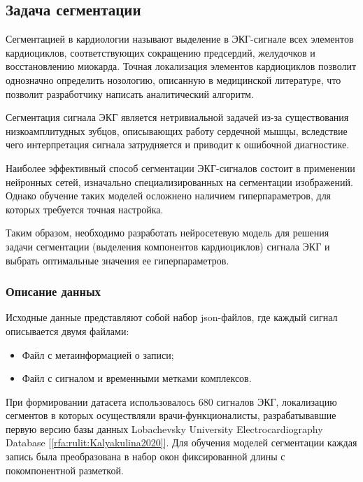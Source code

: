 \documentclass[10pt,a4paper]{book}
\begin{document}
\subsection{Задача сегментации}

Сегментацией в кардиологии называют выделение в ЭКГ-сигнале всех элементов кардиоциклов, соответствующих сокращению предсердий, желудочков и восстановлению миокарда. Точная локализация элементов кардиоциклов позволит однозначно определить нозологию, описанную в медицинской литературе, что позволит разработчику написать аналитический алгоритм.

Сегментация сигнала ЭКГ является нетривиальной задачей из-за существования низкоамплитудных зубцов, описывающих работу сердечной мышцы, вследствие чего интерпретация сигнала затрудняется и приводит к ошибочной диагностике.

Наиболее эффективный способ сегментации ЭКГ-сигналов состоит в применении нейронных сетей, изначально специализированных на сегментации изображений. Однако обучение таких моделей осложнено наличием гиперпараметров, для которых требуется точная настройка.

Таким образом, необходимо разработать нейросетевую модель для решения задачи сегментации (выделения компонентов кардиоциклов) сигнала ЭКГ и выбрать оптимальные значения ее гиперпараметров.

\subsubsection{Описание данных}
Исходные данные представляют собой набор json-файлов, где каждый сигнал описывается двумя файлами:
\begin{itemize}
  \item Файл с метаинформацией о записи;
  \item Файл с сигналом и временными метками комплексов.
\end{itemize}
При формировании датасета использовалось 680 сигналов ЭКГ, локализацию сегментов в которых осуществляли врачи-функционалисты, разрабатывавшие первую версию базы данных Lobachevsky University Electrocardiography Database [\ref{rfa:rulit:Kalyakulina2020}]. Для обучения моделей сегментации каждая запись была преобразована в набор окон фиксированной длины с покомпонентной разметкой.
\end{document}

